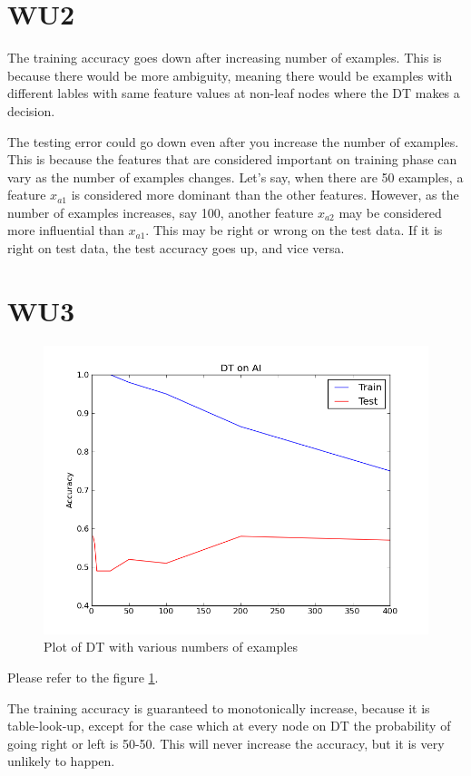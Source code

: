 \section*{WU2}
The training accuracy goes down after increasing number of examples. This is because there would be more ambiguity, meaning there would be examples with different lables with same feature values at non-leaf nodes where the DT makes a decision.

The testing error could go down even after you increase the number of examples. This is because the features that are considered important on training phase can vary as the number of examples changes. Let's say, when there are 50 examples, a feature $x_{a1}$ is considered more dominant than the other features. However, as the number of examples increases, say 100, another feature $x_{a2}$ may be considered more influential than $x_{a1}$. This may be right or wrong on the test data. If it is right on test data, the test accuracy goes up, and vice versa.

\section*{WU3}
\begin{figure}[here]
	\caption{Plot of DT with various numbers of examples}
	\label{fig:dt_examples}
	\includegraphics[width=6.5in]{images/dt_examples.png}
\end{figure}

Please refer to the figure \ref{fig:dt_examples}.

The training accuracy is guaranteed to monotonically increase, because it is table-look-up, except for the case which at every node on DT the probability of going right or left is 50-50. This will never increase the accuracy, but it is very unlikely to happen. 

